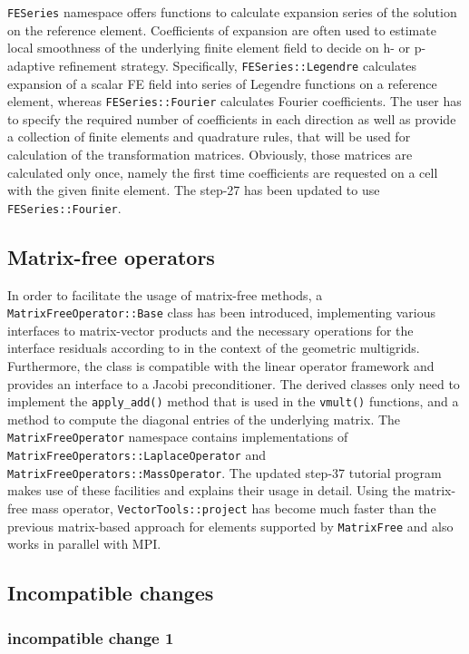 \documentclass{ansarticle-preprint}
\begin{document}
\verb|FESeries| namespace offers functions to calculate expansion series of the solution on the reference element.
Coefficients of expansion are often used to estimate local smoothness of the underlying finite element field to decide on h- or p-adaptive refinement strategy. Specifically, \verb|FESeries::Legendre| calculates expansion of a scalar FE field into series of Legendre functions on a reference element, whereas \verb|FESeries::Fourier| calculates Fourier coefficients. The user has to specify the required number of coefficients in each direction as well as provide a collection of finite elements and quadrature rules, that will be used for calculation of the transformation matrices. Obviously, those matrices are calculated only once, namely the first time coefficients are requested on a cell with the given finite element.
The step-27 has been updated to use \verb|FESeries::Fourier|.

\subsection{Matrix-free operators}

In order to facilitate the usage of matrix-free methods, a \verb!MatrixFreeOperator::Base! class has been introduced,
implementing various interfaces to matrix-vector products and the necessary operations for the interface residuals according to \cite{JanssenKanschat2011} in
the context of the geometric multigrids. Furthermore, the class is compatible with the linear operator framework and provides an interface to a Jacobi preconditioner.
The derived classes only need to implement the \verb!apply_add()! method that is
used in the \verb!vmult()! functions, and a method to compute the diagonal entries of the underlying matrix.
The \verb!MatrixFreeOperator! namespace contains implementations of \verb!MatrixFreeOperators::LaplaceOperator! and
\verb!MatrixFreeOperators::MassOperator!.
The updated step-37 tutorial program makes use of these facilities and
explains their usage in detail. Using the matrix-free mass operator,
\verb!VectorTools::project! has become much faster than the previous
matrix-based approach for elements supported by \verb!MatrixFree! and also
works in parallel with MPI.

\subsection{Incompatible changes}

\subsubsection{incompatible change 1}
\end{document}

